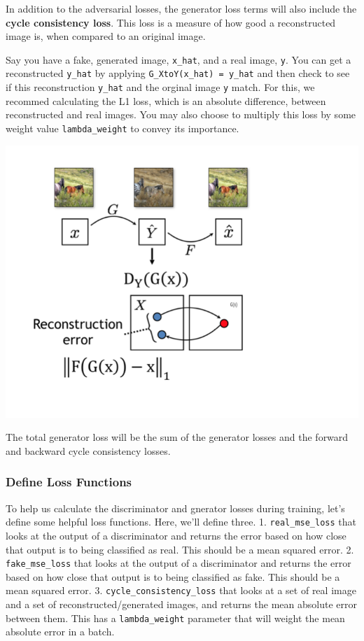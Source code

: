 In addition to the adversarial losses, the generator loss terms will
also include the \textbf{cycle consistency loss}. This loss is a measure
of how good a reconstructed image is, when compared to an original
image. \newline

Say you have a fake, generated image, \lstinline{x_hat},
and a real image, \lstinline{y}. You can get a
reconstructed \lstinline{y_hat} by applying
\lstinline{G_XtoY(x_hat) = y_hat} and then check to see
if this reconstruction \lstinline{y_hat} and the orginal
image \lstinline{y} match. For this, we recommed
calculating the L1 loss, which is an absolute difference, between
reconstructed and real images. You may also choose to multiply this loss
by some weight value \lstinline{lambda_weight} to convey
its importance.

\includegraphics[width=1\linewidth]{img//genAdvNet//image2image/reconstruction_error.png}

The total generator loss will be the sum of the generator losses and the
forward and backward cycle consistency losses.

\subsubsection{Define Loss Functions}

To help us calculate the discriminator and gnerator losses during
training, let's define some helpful loss functions. Here, we'll define
three. 1. \lstinline{real_mse_loss} that looks at the
output of a discriminator and returns the error based on how close that
output is to being classified as real. This should be a mean squared
error. 2. \lstinline{fake_mse_loss} that looks at the
output of a discriminator and returns the error based on how close that
output is to being classified as fake. This should be a mean squared
error. 3. \lstinline{cycle_consistency_loss} that looks
at a set of real image and a set of reconstructed/generated images, and
returns the mean absolute error between them. This has a
\lstinline{lambda_weight} parameter that will weight the
mean absolute error in a batch.\newline

